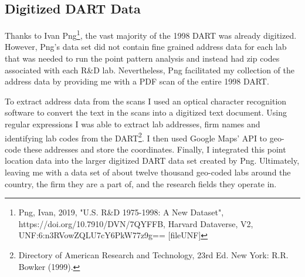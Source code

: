 \documentclass[12pt,letterpaper]{article}
\begin{document}
\subsection{Digitized DART Data}
Thanks to Ivan Png\footnote{Png, Ivan, 2019, "U.S. R\&D 1975-1998: A New Dataset", https://doi.org/10.7910/DVN/7QYFFB, Harvard Dataverse, V2, UNF:6:n3RVowZQLU7cY6PkW77z9g== [fileUNF]}, the vast majority of the 1998 DART was already digitized. However, Png's data set did not contain fine grained address data for each lab that was needed to run the point pattern analysis and instead had zip codes associated with each R\&D lab. Nevertheless, Png facilitated my collection of the address data by providing me with a PDF scan of the entire 1998 DART. 
\par 
To extract address data from the scans I used an optical character recognition software to convert the text in the scans into a digitized text document. Using regular expressions I was able to extract lab addresses, firm names and identifying lab codes from the DART\footnote{Directory of American Research and Technology, 23rd Ed. New York: R.R. Bowker (1999).}. I then used Google Maps' API to geo-code these addresses and store the coordinates. Finally, I integrated this point location data into the larger digitized DART data set created by Png. Ultimately, leaving me with a data set of about twelve thousand geo-coded labs around the country, the firm they are a part of, and the research fields they operate in. 
\end{document}
